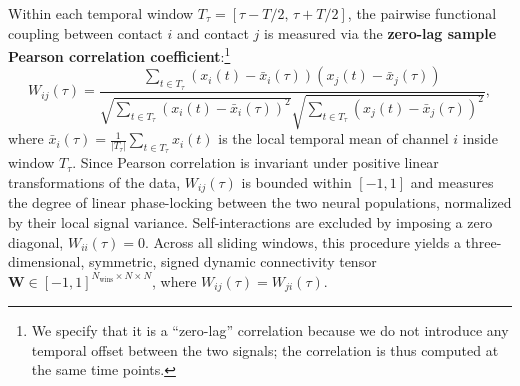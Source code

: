 Within each temporal window $T_\tau = [\tau - T/2, \, \tau + T/2]$, the pairwise functional coupling between contact $i$ and contact $j$ is measured via the \textbf{zero-lag sample Pearson correlation coefficient}:\footnote{We specify that it is a ``zero-lag'' correlation because we do not introduce any temporal offset between the two signals; the correlation is thus computed at the same time points.}
\begin{equation}
    W_{ij}(\tau) = \frac{\sum_{t \in T_\tau} \left(x_i(t) - \bar{x}_i(\tau)\right)\left(x_j(t) - \bar{x}_j(\tau)\right)}{\sqrt{\sum_{t \in T_\tau} \left(x_i(t) - \bar{x}_i(\tau)\right)^2} \sqrt{\sum_{t \in T_\tau} \left(x_j(t) - \bar{x}_j(\tau)\right)^2}},
    \label{eq:pearson}
\end{equation}
where $\bar{x}_i(\tau) = \frac{1}{|T_\tau|} \sum_{t \in T_\tau} x_i(t)$ is the local temporal mean of channel $i$ inside window $T_\tau$. Since Pearson correlation is invariant under positive linear transformations of the data, $W_{ij}(\tau)$ is bounded within $[-1, 1]$ and measures the degree of linear phase-locking between the two neural populations, normalized by their local signal variance. Self-interactions are excluded by imposing a zero diagonal, $W_{ii}(\tau) = 0$. Across all sliding windows, this procedure yields a three-dimensional, symmetric, signed dynamic connectivity tensor $\mathbf{W} \in [-1, 1]^{N_\text{wins} \times N \times N}$, where $W_{ij}(\tau) = W_{ji}(\tau)$.

